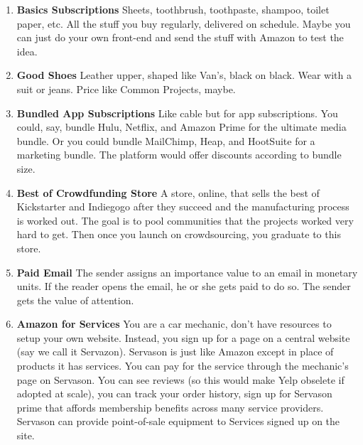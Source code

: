 \documentclass[paper=a4, fontsize=11pt]{scrartcl} %
\numberwithin{equation}{section} %
\numberwithin{figure}{section} %
\numberwithin{table}{section} %
\begin{document}
\begin{enumerate}
\item \textbf{Basics Subscriptions} Sheets, toothbrush, toothpaste, shampoo, toilet paper, etc.  All the stuff you buy regularly, delivered on schedule.  Maybe you can just do your own front-end and send the stuff with Amazon to test the idea.  

\item \textbf{Good Shoes} Leather upper, shaped like Van's, black on black.  Wear with a suit or jeans.  Price like Common Projects, maybe.

\item \textbf{Bundled App Subscriptions} Like cable but for app subscriptions.  You could, say, bundle Hulu, Netflix, and Amazon Prime for the ultimate media bundle.  Or you could bundle MailChimp, Heap, and HootSuite for a marketing bundle.  The platform would offer discounts according to bundle size. 

\item \textbf{Best of Crowdfunding Store} A store, online, that sells the best of Kickstarter and Indiegogo after they succeed and the manufacturing process is worked out.  The goal is to pool communities that the projects worked very hard to get.  Then once you launch on crowdsourcing, you graduate to this store.

\item \textbf{Paid Email} The sender assigns an importance value to an email in monetary units.  If the reader opens the email, he or she gets paid to do so.  The sender gets the value of attention.  

\item \textbf{Amazon for Services} You are a car mechanic, don't have resources to setup your own website.  Instead, you sign up for a page on a central website (say we call it Servazon).  Servason is just like Amazon except in place of products it has services.  You can pay for the service through the mechanic's page on Servason.  You can see reviews (so this would make Yelp obselete if adopted at scale), you can track your order history, sign up for Servason prime that affords membership benefits across many service providers.  Servason can provide point-of-sale equipment to Services signed up on the site.


\end{enumerate}
\end{document}
